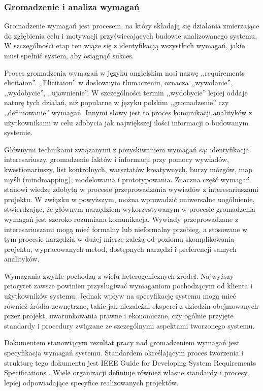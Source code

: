       \subsubsection{Gromadzenie i analiza wymagań}

        Gromadzenie wymagań jest procesem, na który składają się działania zmierzające do zgłębienia celu i motywacji przyświecających budowie analizowanego systemu. W szczególności etap ten wiąże się z identyfikacją wszystkich wymagań, jakie musi spełnić system, aby osiągnąć sukces.
        
        Proces gromadzenia wymagań w języku angielskim nosi nazwę ,,requirements elicitaion''. ,,Elicitaion'' w dosłownym tlumaczeniu, oznacza ,,wywołanie'', ,,wydobycie'', ,,ujawnienie''. W szczególności termin ,,wydobycie'' lepiej oddaje naturę tych działań, niż popularne w języku polskim ,,gromadzenie'' czy ,,definiowanie'' wymagań. Innymi słowy jest to proces komunikacji analityków z użytkownikami w celu zdobycia jak największej ilości informacji o budowanym systemie. 

        Głównymi technikami związanymi z pozyskiwaniem wymagań są: identyfikacja interesariuszy, gromadzenie faktów i informacji przy pomocy wywiadów, kwestionariuszy, list kontrolnych, warsztatów kreatywnych, burzy mózgów, map myśli (mindmapping), modelowania i prototypowania. Znaczna część wymagań stanowi wiedzę zdobytą w procesie przeprowadzania wywiadów z interesariuszami projektu. W związku w powyższym, można wprowadzić uniwersalne uogólnienie, stwierdzając, że głównym narzędziem wykorzystywanym w procesie gromadzenia wymagań jest szeroko rozumiana komunikacja. Wywiady przeprowadzane z interesariuszami mogą mieć formalny lub nieformalny przebieg, a stosowane w tym procesie narzędzia w dużej mierze zależą od poziomu skomplikowania projektu, wypracowanych metod, dostępnych narzędzi i preferencji samych analityków. 
        
        Wymagania zwykle pochodzą z wielu heterogenicznych źródeł. Najwyższy priorytet zawsze powinien przysługiwać wymaganiom pochodzącym od klienta i użytkowników systemu. Jednak wpływ na specyfikację systemu mogą mieć również źródła zewnętrzne, takie jak niezależni eksperci z dziedzin obejmowanych przez projekt, uwarunkowania prawne i ekonomiczne, czy ogólnie przyjęte standardy i procedury związane ze szczególnymi aspektami tworzonego systemu.

        Dokumentem stanowiącym rezultat pracy nad gromadzeniem wymagań jest specyfikacja wymagań systemu. Standardem określającym proces tworzenia i strukturę tego dokumentu jest IEEE Guide for Developing System Requirements Specifications \cite{institute1984ieee}. Wiele organizacji definiuje również własne standardy i procesy, lepiej odpowiadające specyfice realizowanych projektów.

